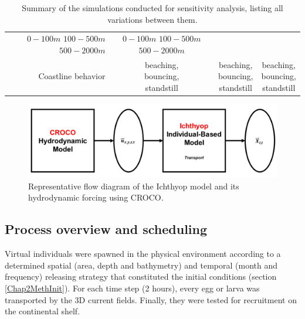 \begin{landscape}
\begin{table}[H]
\begin{tabular}{r|c|c|c}
\makecell{$0-100 m$ \\ $100-500 m$ \\ $500-2000 m$}	&
\makecell{$0-100 m$ \\ $100-500 m$ \\ $500-2000 m$}	\\
Coastline behavior								&
\makecell{beaching,\\bouncing,\\standstill}	&
\makecell{beaching,\\bouncing,\\standstill}	&
\makecell{beaching,\\bouncing,\\standstill}	\\
\hline
\end{tabular}
\caption{Summary of the simulations conducted for sensitivity analysis, listing all variations between them.}
\label{TabSimus}
\end{table}
\end{landscape}

\begin{figure}[H]
	\includegraphics[width=1.0\textwidth]{figures/Chap2Ichthyop.png}
	\centering
	\caption{Representative flow diagram of the Ichthyop model and its hydrodynamic forcing using CROCO.}
	\label{Chap2Ichthyop}
\end{figure}

\subsection{Process overview and scheduling}\label{Chap2MethProc}

Virtual individuals were spawned in the physical environment according to a determined spatial (area, depth and bathymetry) and temporal (month and frequency) releasing strategy that constituted the initial conditions (section \ref{Chap2MethInit}). For each time step (2 hours), every egg or larva was transported by the 3D current fields. Finally, they were tested for recruitment on the continental shelf.\\

